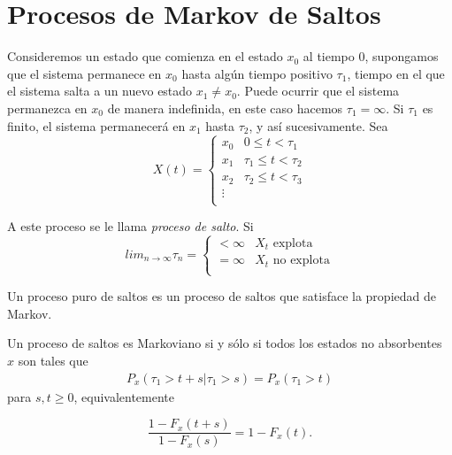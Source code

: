 %
\section{Procesos de Markov de Saltos}
%


Consideremos un estado que comienza en el estado $x_{0}$ al tiempo $0$, supongamos que el sistema permanece en $x_{0}$ hasta alg\'un tiempo positivo $\tau_{1}$, tiempo en el que el sistema salta a un nuevo estado $x_{1}\neq x_{0}$. Puede ocurrir que el sistema permanezca en $x_{0}$ de manera indefinida, en este caso hacemos $\tau_{1}=\infty$. Si $\tau_{1}$ es finito, el sistema permanecer\'a en $x_{1}$ hasta $\tau_{2}$, y as\'i sucesivamente.
Sea
\begin{equation}
X\left(t\right)=\left\{\begin{array}{cc}
x_{0} & 0\leq t<\tau_{1}\\
x_{1} & \tau_{1}\leq t<\tau_{2}\\
x_{2} & \tau_{2}\leq t<\tau_{3}\\
\vdots &\\
\end{array}\right.
\end{equation}

A este proceso  se le llama {\em proceso de salto}. Si
\begin{equation}
lim_{n\rightarrow\infty}\tau_{n}=\left\{\begin{array}{cc}
<\infty & X_{t}\textrm{ explota}\\
=\infty & X_{t}\textrm{ no explota}\\
\end{array}\right.
\end{equation}

Un proceso puro de saltos es un proceso de saltos que satisface la propiedad de Markov.

\begin{Prop}
Un proceso de saltos es Markoviano si y s\'olo si todos los estados no absorbentes $x$ son tales que
\begin{eqnarray*}
P_{x}\left(\tau_{1}>t+s|\tau_{1}>s\right)=P_{x}\left(\tau_{1}>t\right)
\end{eqnarray*}
para $s,t\geq0$, equivalentemente

\begin{equation}\label{Eq.5}
\frac{1-F_{x}\left(t+s\right)}{1-F_{x}\left(s\right)}=1-F_{x}\left(t\right).
\end{equation}
\end{Prop}

